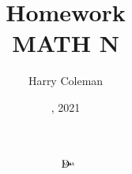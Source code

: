 \documentclass[12pt]{article}
\title{Homework\\
    \large MATH N
}
\author{Harry Coleman}
\date{, 2021}
\theoremstyle{definition}
\newcommand*{\putxys}[4]{%
    \makebox[0pt][l]{%
        \hspace*{#1}%
        \raisebox{#2}{%
            {\fontsize{#3}{#3}#4}%
        }%
    }%
}
\newcommand{\DD}{\operatorname{D\putxys{-6.1pt}{2pt}{5pt}{\Cat}}}
\begin{document}
\maketitle

\[
    \DD
\]
\end{document}
